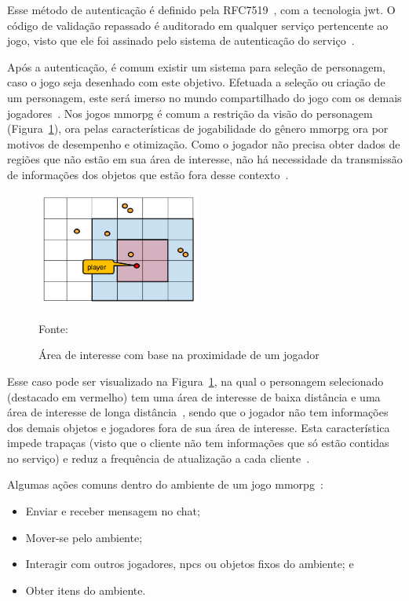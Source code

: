 Esse método de autenticação é definido pela RFC7519~\cite{rfc7519}, com a tecnologia \ac{jwt}.
%
O código de validação repassado é auditorado em qualquer serviço pertencente ao jogo, visto que ele foi assinado pelo sistema de autenticação do serviço~\cite{Ikem2018May}.


Após a autenticação, é comum existir um sistema para seleção de personagem, caso o jogo seja desenhado com este objetivo.
%
Efetuada a seleção ou criação de um personagem, este será imerso no mundo compartilhado do jogo com os demais jogadores~\cite{matthiasrudy2011}.
%
Nos jogos \ac{mmorpg} é comum a restrição da visão do personagem (Figura~\ref{fig:proximidade}), ora pelas características de jogabilidade do gênero \ac{mmorpg} ora por motivos de desempenho e otimização.
%
Como o jogador não precisa obter dados de regiões que não estão em sua área de interesse, não há necessidade da transmissão de informações dos objetos que estão fora desse contexto~\cite{albion_online_unite}.

\begin{figure}[htb!]
\caption{Área de interesse com base na proximidade de um jogador}
\label{fig:proximidade}
\includegraphics[height=3.8cm]{img/cap2/proximidade.png}
\centering

Fonte:~\cite{albion_online_unite}
\end{figure}

%
Esse caso pode ser visualizado na Figura~\ref{fig:proximidade}, na qual o personagem selecionado (destacado em vermelho) tem uma área de interesse de baixa distância e uma área de interesse de longa distância~\cite{albion_online_unite}, sendo que o jogador não tem informações dos demais objetos e jogadores fora de sua área de interesse.
%
Esta característica impede trapaças (visto que o cliente não tem informações que só estão contidas no serviço) e reduz a frequência de atualização a cada cliente~\cite{albion_online_unite}.


Algumas ações comuns dentro do ambiente de um jogo \ac{mmorpg}~\cite{mmorpg_culture}:

\begin{itemize}
  \item Enviar e receber mensagem no chat;
  \item Mover-se pelo ambiente;
  \item Interagir com outros jogadores, \ac{npcs} ou objetos fixos do ambiente; e
  \item Obter itens do ambiente.
\end{itemize}



